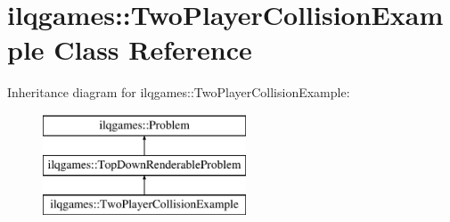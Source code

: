 \hypertarget{classilqgames_1_1_two_player_collision_example}{}\section{ilqgames\+:\+:Two\+Player\+Collision\+Example Class Reference}
\label{classilqgames_1_1_two_player_collision_example}
Inheritance diagram for ilqgames\+:\+:Two\+Player\+Collision\+Example\+:\begin{figure}[H]
\begin{center}
\leavevmode
\includegraphics[height=3.000000cm]{classilqgames_1_1_two_player_collision_example}
\end{center}
\end{figure}
